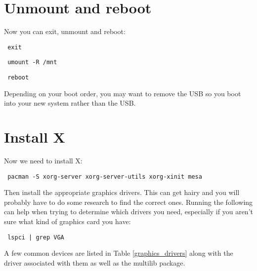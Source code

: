 \documentclass[12pt]{article}
\begin{document}
\section*{Unmount and reboot}
    Now you can exit, unmount and reboot:
    \begin{verbatim} exit \end{verbatim}
    \begin{verbatim} umount -R /mnt \end{verbatim}
    \begin{verbatim} reboot \end{verbatim}
    Depending on your boot order, you may want to remove the USB so you boot
    into your new system rather than the USB.

\section*{Install X}
    Now we need to install X:
    \begin{verbatim} pacman -S xorg-server xorg-server-utils xorg-xinit mesa \end{verbatim}
    Then install the appropriate graphics drivers. This can get hairy and you
    will probably have to do some research to find the correct ones. Running
    the following can help when trying to determine which drivers you need,
    especially if you aren't sure what kind of graphics card you have:
    \begin{verbatim} lspci | grep VGA \end{verbatim}
    A few common devices are listed in Table \ref{graphics_drivers} along with
    the driver associated with them as well as the multilib package.
\end{document}
